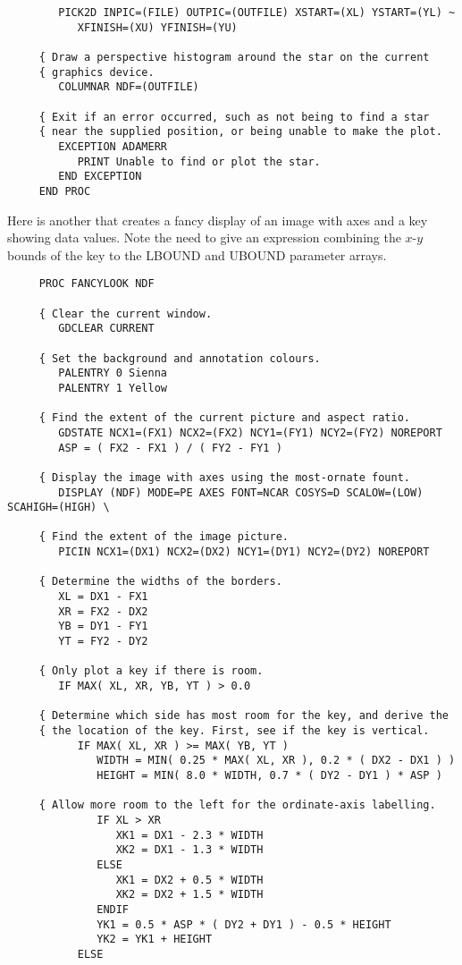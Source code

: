 {\begin{verbatim}
        PICK2D INPIC=(FILE) OUTPIC=(OUTFILE) XSTART=(XL) YSTART=(YL) ~
           XFINISH=(XU) YFINISH=(YU)

     { Draw a perspective histogram around the star on the current
     { graphics device.
        COLUMNAR NDF=(OUTFILE)

     { Exit if an error occurred, such as not being to find a star
     { near the supplied position, or being unable to make the plot.
        EXCEPTION ADAMERR
           PRINT Unable to find or plot the star.
        END EXCEPTION
     END PROC
\end{verbatim}
\normalsize

Here is another that creates a fancy display of an image with axes and
a key showing data values.  Note the need to give an expression
combining the $x$-$y$ bounds of the key to the LBOUND and UBOUND
parameter arrays.

\small
\begin{verbatim}
     PROC FANCYLOOK NDF

     { Clear the current window.
        GDCLEAR CURRENT

     { Set the background and annotation colours.
        PALENTRY 0 Sienna
        PALENTRY 1 Yellow

     { Find the extent of the current picture and aspect ratio.
        GDSTATE NCX1=(FX1) NCX2=(FX2) NCY1=(FY1) NCY2=(FY2) NOREPORT
        ASP = ( FX2 - FX1 ) / ( FY2 - FY1 )

     { Display the image with axes using the most-ornate fount.
        DISPLAY (NDF) MODE=PE AXES FONT=NCAR COSYS=D SCALOW=(LOW) SCAHIGH=(HIGH) \

     { Find the extent of the image picture.
        PICIN NCX1=(DX1) NCX2=(DX2) NCY1=(DY1) NCY2=(DY2) NOREPORT

     { Determine the widths of the borders.
        XL = DX1 - FX1
        XR = FX2 - DX2
        YB = DY1 - FY1
        YT = FY2 - DY2

     { Only plot a key if there is room. 
        IF MAX( XL, XR, YB, YT ) > 0.0

     { Determine which side has most room for the key, and derive the
     { the location of the key. First, see if the key is vertical.
           IF MAX( XL, XR ) >= MAX( YB, YT )
              WIDTH = MIN( 0.25 * MAX( XL, XR ), 0.2 * ( DX2 - DX1 ) )
              HEIGHT = MIN( 8.0 * WIDTH, 0.7 * ( DY2 - DY1 ) * ASP )

     { Allow more room to the left for the ordinate-axis labelling.
              IF XL > XR
                 XK1 = DX1 - 2.3 * WIDTH
                 XK2 = DX1 - 1.3 * WIDTH
              ELSE
                 XK1 = DX2 + 0.5 * WIDTH
                 XK2 = DX2 + 1.5 * WIDTH
              ENDIF
              YK1 = 0.5 * ASP * ( DY2 + DY1 ) - 0.5 * HEIGHT
              YK2 = YK1 + HEIGHT
           ELSE


\end{verbatim}}

